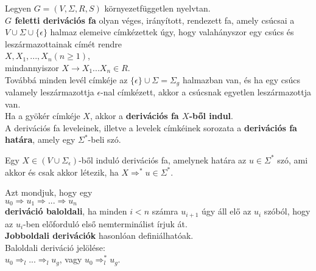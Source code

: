 \begin{frame}
\begin{tcolorbox}[title={Def.: Derivációs fa}]
Legyen $G = (V, {\Sigma}, R, S)$ környezetfüggetlen nyelvtan.\\
\textbf{$G$ feletti derivációs fa} olyan véges, irányított, rendezett fa, amely csúcsai a $V \cup {\Sigma} \cup \{{\epsilon}\}$ halmaz elemeive címkézettek úgy, hogy valahányszor egy csúcs és leszármazottainak címét rendre\\
\mmedskip
$X, X_1, ..., X_n (n \geq 1)$,\\
mindannyiszor $X \rightarrow X_1...X_n \in R$.\\
\mmedskip
Továbbá minden levél címkéje az $\{{\epsilon}\} \cup {\Sigma} = {\Sigma}_g$ halmazban van, és ha egy csúcs valamely leszármazottja $\epsilon$-nal címkézett, akkor a csúcsnak egyetlen leszármazottja van.\\
\mbigskip
Ha a gyökér címkéje $X$, akkor a \textbf{derivációs fa $X$-ből indul}.\\
\mbigskip
A derivációs fa leveleinek, illetve a levelek címkéinek sorozata a \textbf{derivációs fa határa}, amely egy ${\Sigma}^*$-beli szó.
\end{tcolorbox}
\end{frame}

\begin{frame}
\begin{tcolorbox}[title={Tétel: Derivációs fák}]
Egy $X \in (V \cup {\Sigma}_{\epsilon})$-ből induló derivációs fa, amelynek határa az $u \in {\Sigma}^*$ szó, ami akkor és csak akkor létezik, ha $X {\Rightarrow}^* u \in {\Sigma}^*$.
\end{tcolorbox}

\begin{tcolorbox}[title={Def.: Jobb-, Baloldali deriváció}]
Azt mondjuk, hogy egy\\
\mbigskip
$u_0 \Rightarrow u_1 \Rightarrow ... \Rightarrow u_n$\\
\mbigskip
\textbf{deriváció baloldali}, ha minden $i < n$ számra $u_{i + 1}$ úgy áll elő az $u_i$ szóból, hogy az $u_i$-ben előforduló első nemterminálist írjuk át.\\
\mbigskip
\textbf{Jobboldali derivációk} hasonlóan definiálhatóak.\\
\mbigskip
Baloldali deriváció jelölése:\\
\mbigskip
$u_0 {\Rightarrow}_l ... {\Rightarrow}_l u_g$, vagy $u_0 {\Rightarrow}^*_l u_g$.
\end{tcolorbox}
\end{frame}

